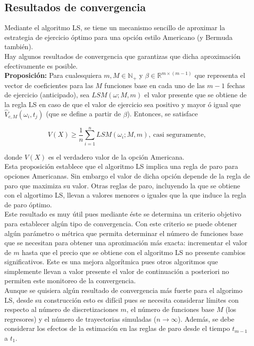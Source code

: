 \documentclass[11pt]{article}
\begin{document}
\subsection{Resultados de convergencia}

Mediante el algoritmo LS, se tiene un mecanismo sencillo de aproximar la estrategia de ejercicio óptimo para una opción estilo Americano (y Bermuda también).\\

Hay algunos resultados de convergencia que garantizas que dicha aproximación efectivamente es posible.\\

\textbf{Proposición:}
Para cualesquiera $m,M\in \mathbb{N}_+$ y $\beta\in\mathbb{R}^{m\times(m-1)}$ que representa el vector de coeficientes para las $M$ funciones base en cada uno de las $m-1$ fechas de ejercicio (anticipado), sea $LSM(\omega;M,m)$ el valor presente que se obtiene de la regla LS en caso de que el valor de ejercicio sea positivo y mayor ó igual que $\widehat{V}_{c,M}(\omega_i,t_j)$ (que se define a partir de $\beta$). Entonces, se satisface

$$V(X)\geq \frac{1}{n}\sum_{i=1}^n LSM(\omega_i;M,m),\ \mbox{casi seguramente},$$

donde $V(X)$ es el verdadero valor de la opción Americana.\\

Esta proposición establece que el algoritmo LS implica una regla de paro para opciones Americanas. Sin embargo el valor de dicha opción depende de la regla de paro que maximiza su valor. Otras reglas de paro,
incluyendo la que se obtiene con el algortimo LS, llevan a valores menores o iguales que la que induce la regla de paro óptimo.\\

Este resultado es muy útil pues mediante éste se determina un criterio objetivo para establecer algún tipo de convergencia. Con este criterio se puede obtener algún parámetro o métrica que permita determinar el número de funciones base que se necesitan para obtener una aproximación más exacta: incrementar el valor de $m$ hasta que el precio que se
obtiene con el algoritmo LS no presente cambios significativos. Este es una mejora algorítmica pues otros algoritmos que simplemente llevan a valor presente el valor de continuación a posteriori no permiten este monitoreo de la convergencia.\\

Aunque se quisiera algún resultado de convergencia más fuerte para el algorimo LS, desde su construcción esto es difícil pues se necesita considerar límites con respecto al número de discretizaciones $m$, el
número de funciones base $M$ (los regresores) y el número de trayectorias simuladas ($n\rightarrow \infty$). Además, se debe considerar los efectos de la estimación en las reglas de paro desde el
tiempo $t_{m-1}$ a $t_1$.\\
\end{document}
